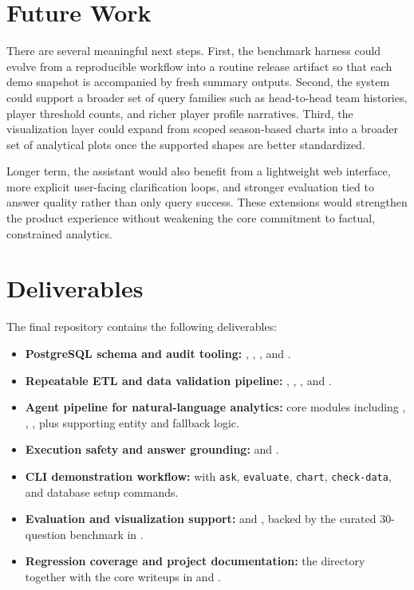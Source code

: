 \documentclass[11pt]{article}
\begin{document}
\section{Future Work}
There are several meaningful next steps. First, the benchmark harness could evolve from a reproducible workflow into a routine release artifact so that each demo snapshot is accompanied by fresh summary outputs. Second, the system could support a broader set of query families such as head-to-head team histories, player threshold counts, and richer player profile narratives. Third, the visualization layer could expand from scoped season-based charts into a broader set of analytical plots once the supported shapes are better standardized.

Longer term, the assistant would also benefit from a lightweight web interface, more explicit user-facing clarification loops, and stronger evaluation tied to answer quality rather than only query success. These extensions would strengthen the product experience without weakening the core commitment to factual, constrained analytics.

\section{Deliverables}
The final repository contains the following deliverables:
\begingroup
\sloppy
\begin{itemize}[leftmargin=1.5em]
    \item \textbf{PostgreSQL schema and audit tooling:} , , , and .
    \item \textbf{Repeatable ETL and data validation pipeline:} , , , and .
    \item \textbf{Agent pipeline for natural-language analytics:} core modules including , , , plus supporting entity and fallback logic.
    \item \textbf{Execution safety and answer grounding:}  and .
    \item \textbf{CLI demonstration workflow:}  with \texttt{ask}, \texttt{evaluate}, \texttt{chart}, \texttt{check-data}, and database setup commands.
    \item \textbf{Evaluation and visualization support:}  and , backed by the curated 30-question benchmark in .
    \item \textbf{Regression coverage and project documentation:} the  directory together with the core writeups in  and .
\end{itemize}
\endgroup
\end{document}
